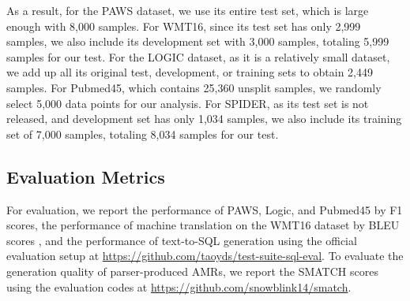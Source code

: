 \begin{enumerate}
As a result, for the PAWS dataset, we use its entire test set, which is large enough with 8,000 samples.
For WMT16, since its test set has only 2,999 samples, we also include its development set with 3,000 samples, totaling 5,999 samples for our test.
For the LOGIC dataset, as it is a relatively small dataset, we add up all its original test, development, or training sets to obtain 2,449 samples.
For Pubmed45, which contains 25,360 unsplit samples, we randomly select 5,000 data points for our analysis. 
For SPIDER, as its test set is not released, and development set has only 1,034 samples, we also include its training set of 7,000 samples, totaling 8,034 samples for our test.

\subsection{Evaluation Metrics}\label{appd:eval}
For evaluation, we report the performance of PAWS, Logic, and Pubmed45 by F1 scores, the performance of machine translation on the WMT16 dataset
by BLEU scores \citep{papineni2002bleu}, and the performance of text-to-SQL generation using the official evaluation setup at \url{https://github.com/taoyds/test-suite-sql-eval}.
To evaluate the generation quality of parser-produced AMRs, we report the SMATCH scores using the evaluation codes at \url{https://github.com/snowblink14/smatch}.


\end{enumerate}
